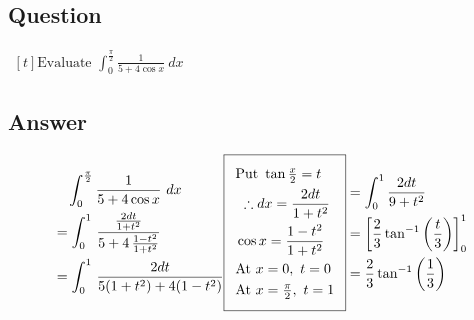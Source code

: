 \documentclass[17pt]{extarticle}
\begin{document}
\begin{fleqn}
\section{Question} 

$\begin{aligned}[t] 
\text{Evaluate \ } \int_{0}^{\frac{\pi}{2}} \frac{1}{5 + 4\cos x}\ dx
\end{aligned}$

\subsection*{Answer}
\begin{equation} \nonumber
\begin{alignedat}{4}
& \quad  \int_{0}^{\frac{\pi}{2}} \frac{1}{5 + 4\cos x}\ dx \\
&= \int_{0}^{1}\,\frac{\frac{2dt}{1+ t^2}}{5 + 4\, \frac{1 - t^2}{1 + t^2}}\\
&= \int_{0}^{1}\,\frac{2dt}{5(1+t^2) + 4(1-t^2)}\\
\end{alignedat}
\begin{alignedat}{4}
    \addtolength{\fboxsep}{5pt}
    \boxed{
     \begin{split}
       & \text{Put } \tan \tfrac{x}{2}=t\\
       & \ \therefore dx =\frac{2dt}{1 + t^2}\\
        & \cos x =  \frac{1 - t^2}{1 + t^2}\\
         & \text{At } x=0,\  t=0\\
         & \text{At } x=\tfrac{\pi}{2},\  t=1\\
        \end{split}
     }\end{alignedat}
\begin{alignedat}{4}
&= \int_{0}^{1}\frac{2dt}{9+t^2}\\
&= \left[\frac{2}{3}\tan^{-1}\left(\frac{t}{3}\right)\right]_{0}^{1}\\
&= \frac{2}{3}\tan^{-1}\left(\frac{1}{3}\right)\\
\end{alignedat}
\end{equation}

\end{fleqn}
\end{document}
